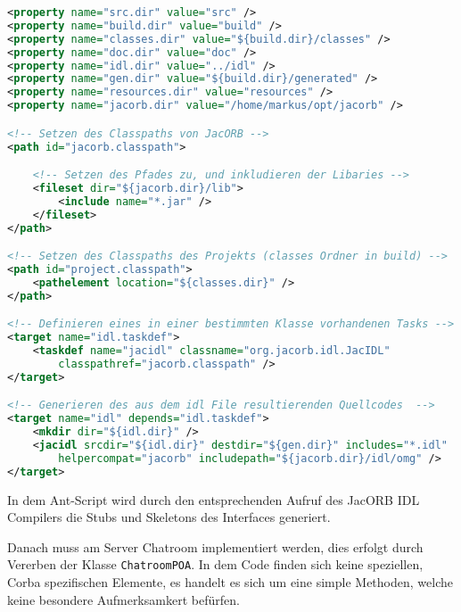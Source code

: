 \begin{lstlisting}[language=XML, caption=Ant Task f\"ur die Generierung der IDL Interfaces]
<property name="src.dir" value="src" />
<property name="build.dir" value="build" />
<property name="classes.dir" value="${build.dir}/classes" />
<property name="doc.dir" value="doc" />
<property name="idl.dir" value="../idl" />
<property name="gen.dir" value="${build.dir}/generated" />
<property name="resources.dir" value="resources" />
<property name="jacorb.dir" value="/home/markus/opt/jacorb" />

<!-- Setzen des Classpaths von JacORB -->
<path id="jacorb.classpath">

	<!-- Setzen des Pfades zu, und inkludieren der Libaries -->
	<fileset dir="${jacorb.dir}/lib">
		<include name="*.jar" />
	</fileset>
</path>

<!-- Setzen des Classpaths des Projekts (classes Ordner in build) -->
<path id="project.classpath">
	<pathelement location="${classes.dir}" />
</path>

<!-- Definieren eines in einer bestimmten Klasse vorhandenen Tasks -->
<target name="idl.taskdef">
	<taskdef name="jacidl" classname="org.jacorb.idl.JacIDL"
		classpathref="jacorb.classpath" />
</target>

<!-- Generieren des aus dem idl File resultierenden Quellcodes  -->
<target name="idl" depends="idl.taskdef">
	<mkdir dir="${idl.dir}" />
	<jacidl srcdir="${idl.dir}" destdir="${gen.dir}" includes="*.idl"
		helpercompat="jacorb" includepath="${jacorb.dir}/idl/omg" />
</target>
\end{lstlisting}

In dem Ant-Script wird durch den entsprechenden Aufruf des JacORB IDL Compilers die Stubs und Skeletons des Interfaces generiert.

Danach muss am Server Chatroom implementiert werden, dies erfolgt durch Vererben der Klasse \texttt{ChatroomPOA}.
In dem Code finden sich keine speziellen, Corba spezifischen Elemente, es handelt es sich um eine simple Methoden, welche keine besondere Aufmerksamkert bef\"urfen.

